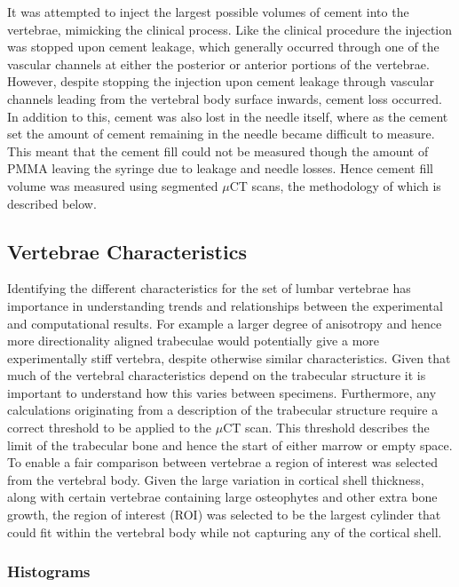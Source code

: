 It was attempted to inject the largest possible volumes of cement into the vertebrae, mimicking the clinical process.
Like the clinical procedure the injection was stopped upon cement leakage, which generally occurred through one of the vascular channels at either the posterior or anterior portions of the vertebrae.
However, despite stopping the injection upon cement leakage through vascular channels leading from the vertebral body surface inwards, cement loss occurred.
In addition to this, cement was also lost in the needle itself, where as the cement set the amount of cement remaining in the needle became difficult to measure.
This meant that the cement fill could not be measured though the amount of PMMA leaving the syringe due to leakage and needle losses.
Hence cement fill volume was measured using segmented $\mu$CT scans, the methodology of which is described below.

\subsection{Vertebrae Characteristics}

Identifying the different characteristics for the set of lumbar vertebrae has
importance in understanding trends and relationships between the experimental
and computational results. For example a larger degree of anisotropy and hence
more directionality aligned trabeculae would potentially give a more
experimentally stiff vertebra, despite otherwise similar characteristics. Given
that much of the vertebral characteristics depend on the trabecular structure it
is important to understand how this varies between specimens. Furthermore, any
calculations originating from a description of the trabecular structure require
a correct threshold to be applied to the $\mu$CT scan. This threshold describes
the limit of the trabecular bone and hence the start of either marrow or empty
space. To enable a fair comparison between vertebrae a region of interest was
selected from the vertebral body. Given the large variation in cortical shell
thickness, along with certain vertebrae containing large osteophytes and other
extra bone growth, the region of interest (ROI) was selected to be the largest
cylinder that could fit within the vertebral body while not capturing any of the
cortical shell.

\subsubsection{Histograms}

